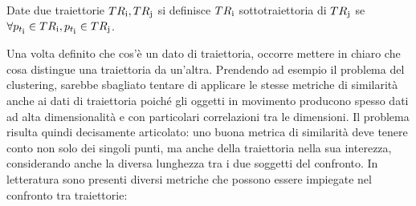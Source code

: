 \begin{definition}[Sottotraiettoria]

  Date due traiettorie \(TR\textsubscript{i}, TR\textsubscript{j}\) si definisce  \(TR\textsubscript{i}\) sottotraiettoria di \(TR\textsubscript{j}\) se \(\forall p_{t\textsubscript{i}} \in TR\textsubscript{i}, p_{t\textsubscript{i}} \in TR\textsubscript{j}\).

\end{definition}

Una volta definito che cos'è un dato di traiettoria, occorre mettere in chiaro che cosa distingue una traiettoria da un'altra.
Prendendo ad esempio il problema del clustering, sarebbe sbagliato tentare di applicare le stesse metriche di similarità anche ai dati di traiettoria
poiché gli oggetti in movimento producono spesso dati ad alta dimensionalità e con particolari correlazioni tra le dimensioni.
Il problema risulta quindi decisamente articolato: uno buona metrica di similarità deve tenere conto non solo dei singoli punti, ma anche della
traiettoria nella sua interezza, considerando anche la diversa lunghezza tra i due soggetti del confronto.
In letteratura sono presenti diversi metriche che possono essere impiegate nel confronto tra traiettorie:

